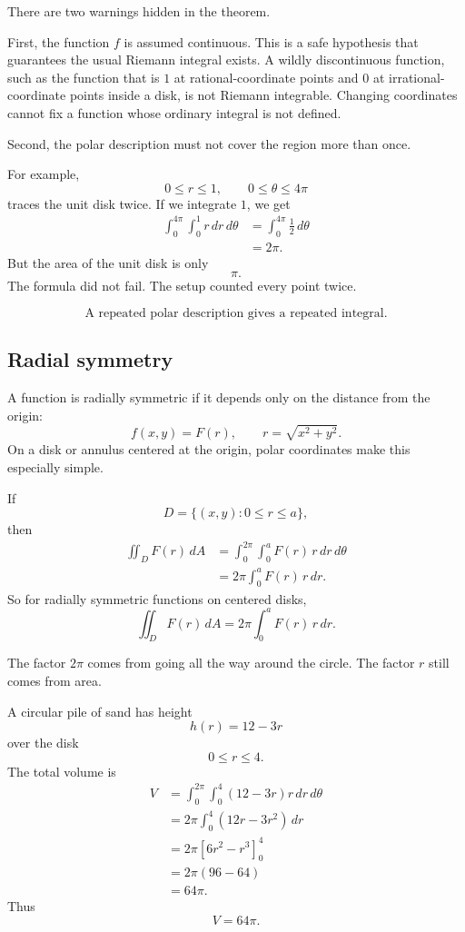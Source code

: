 There are two warnings hidden in the theorem.

First, the function \(f\) is assumed continuous.  This is a safe hypothesis that guarantees
the usual Riemann integral exists.  A wildly discontinuous function, such as the function
that is \(1\) at rational-coordinate points and \(0\) at irrational-coordinate points inside
a disk, is not Riemann integrable.  Changing coordinates cannot fix a function whose
ordinary integral is not defined.

Second, the polar description must not cover the region more than once.

For example,
\[
    0\le r\le1,
    \qquad
    0\le\theta\le4\pi
\]
traces the unit disk twice.  If we integrate \(1\), we get
\[
\begin{aligned}
    \int_0^{4\pi}\int_0^1 r\,dr\,d\theta
    &=
    \int_0^{4\pi}\frac12\,d\theta\\
    &=
    2\pi.
\end{aligned}
\]
But the area of the unit disk is only
\[
    \pi.
\]
The formula did not fail.  The setup counted every point twice.

\[
\boxed{
    \text{A repeated polar description gives a repeated integral.}
}
\]

\subsection{Radial symmetry}

A function is radially symmetric if it depends only on the distance from the origin:
\[
    f(x,y)=F(r),
    \qquad
    r=\sqrt{x^2+y^2}.
\]
On a disk or annulus centered at the origin, polar coordinates make this especially
simple.

If
\[
    D=\{(x,y):0\le r\le a\},
\]
then
\[
\begin{aligned}
    \iint_D F(r)\,dA
    &=
    \int_0^{2\pi}\int_0^a F(r)\,r\,dr\,d\theta\\
    &=
    2\pi\int_0^a F(r)\,r\,dr.
\end{aligned}
\]
So for radially symmetric functions on centered disks,
\[
\boxed{
    \iint_D F(r)\,dA
    =
    2\pi\int_0^a F(r)\,r\,dr.
}
\]

The factor \(2\pi\) comes from going all the way around the circle.  The factor \(r\)
still comes from area.

\begin{example}
A circular pile of sand has height
\[
    h(r)=12-3r
\]
over the disk
\[
    0\le r\le4.
\]
The total volume is
\[
\begin{aligned}
    V
    &=
    \int_0^{2\pi}\int_0^4 (12-3r)r\,dr\,d\theta\\
    &=
    2\pi\int_0^4 (12r-3r^2)\,dr\\
    &=
    2\pi\left[6r^2-r^3\right]_0^4\\
    &=
    2\pi(96-64)\\
    &=
    64\pi.
\end{aligned}
\]
Thus
\[
\boxed{
    V=64\pi.
}
\]
\end{example}


